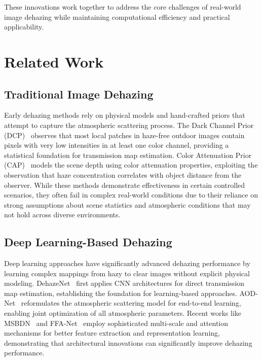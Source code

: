 \documentclass{article}
\begin{document}
These innovations work together to address the core challenges of real-world image dehazing while maintaining computational efficiency and practical applicability.

\section{Related Work}

\subsection{Traditional Image Dehazing}

Early dehazing methods rely on physical models and hand-crafted priors that attempt to capture the atmospheric scattering process. The Dark Channel Prior (DCP)~\cite{he2010single} observes that most local patches in haze-free outdoor images contain pixels with very low intensities in at least one color channel, providing a statistical foundation for transmission map estimation. Color Attenuation Prior (CAP)~\cite{zhu2015fast} models the scene depth using color attenuation properties, exploiting the observation that haze concentration correlates with object distance from the observer. While these methods demonstrate effectiveness in certain controlled scenarios, they often fail in complex real-world conditions due to their reliance on strong assumptions about scene statistics and atmospheric conditions that may not hold across diverse environments.

\subsection{Deep Learning-Based Dehazing}

Deep learning approaches have significantly advanced dehazing performance by learning complex mappings from hazy to clear images without explicit physical modeling. DehazeNet~\cite{cai2016dehazenet} first applies CNN architectures for direct transmission map estimation, establishing the foundation for learning-based approaches. AOD-Net~\cite{li2017aod} reformulates the atmospheric scattering model for end-to-end learning, enabling joint optimization of all atmospheric parameters. Recent works like MSBDN~\cite{dong2020multi} and FFA-Net~\cite{qin2020ffa} employ sophisticated multi-scale and attention mechanisms for better feature extraction and representation learning, demonstrating that architectural innovations can significantly improve dehazing performance.
\end{document}
